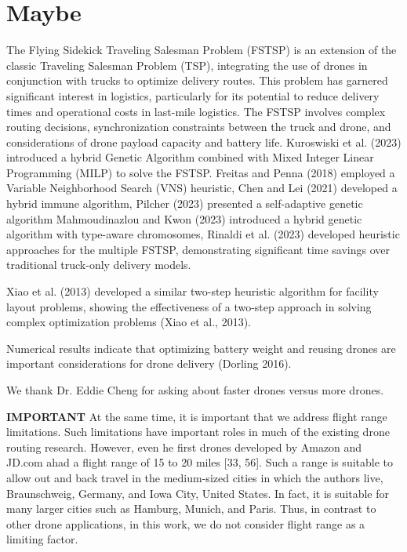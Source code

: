 \documentclass[twocolumn]{article}
\begin{document}
	\section{Maybe}
	The Flying Sidekick Traveling Salesman Problem (FSTSP) is an extension of the classic Traveling Salesman Problem (TSP), integrating the use of drones in conjunction with trucks to optimize delivery routes. This problem has garnered significant interest in logistics, particularly for its potential to reduce delivery times and operational costs in last-mile logistics. The FSTSP involves complex routing decisions, synchronization constraints between the truck and drone, and considerations of drone payload capacity and battery life. Kuroswiski et al. (2023) introduced a hybrid Genetic Algorithm combined with Mixed Integer Linear Programming (MILP) to solve the FSTSP. Freitas and Penna (2018) employed a Variable Neighborhood Search (VNS) heuristic, Chen and Lei (2021) developed a hybrid immune algorithm, Pilcher (2023) presented a self-adaptive genetic algorithm Mahmoudinazlou and Kwon (2023) introduced a hybrid genetic algorithm with type-aware chromosomes, Rinaldi et al. (2023) developed heuristic approaches for the multiple FSTSP, demonstrating significant time savings over traditional truck-only delivery models.
	\par
	Xiao et al. (2013) developed a similar two-step heuristic algorithm for facility layout problems, showing the effectiveness of a two-step approach in solving complex optimization problems (Xiao et al., 2013).
	\par 
	Numerical results indicate that optimizing battery weight and reusing drones are important considerations for drone delivery (Dorling 2016).
	\par 
	We thank Dr. Eddie Cheng for asking about faster drones versus more drones.
	\par 
	\textbf{IMPORTANT}
	At the same time, it is important that we address flight range limitations. Such limitations have important roles in much of
	the existing drone routing research. However, even he first drones developed by Amazon and JD.com ahad a flight range of 15
	to 20 miles [33, 56]. Such a range is suitable to allow out and back travel in the medium-sized cities in which the authors live,
	Braunschweig, Germany, and Iowa City, United States. In fact, it is suitable for many larger cities such as Hamburg, Munich,
	and Paris. Thus, in contrast to other drone applications, in this work, we do not consider flight range as a limiting factor.
	\par 
\end{document}
